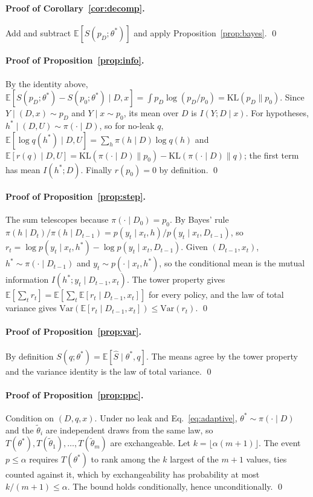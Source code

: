\documentclass[10pt]{article}
\theoremstyle{definition}
\theoremstyle{remark}
\theoremstyle{plain}
\newcommand{\E}{\mathbb{E}}
\newcommand{\KL}{\mathrm{KL}}
\newcommand{\thetastar}{\theta^{*}}
\begin{document}
\paragraph{Proof of Corollary~\ref{cor:decomp}.}
Add and subtract $\E[S(p_D;\thetastar)]$ and apply Proposition~\ref{prop:bayes}. \qed

\paragraph{Proof of Proposition~\ref{prop:info}.}
By the identity above, $\E[S(p_D;\thetastar)-S(p_0;\thetastar)\mid D,x]=\int p_D\log(p_D/p_0)=
\KL(p_D\|p_0)$. Since $Y\mid(D,x)\sim p_D$ and $Y\mid x\sim p_0$, its mean over $D$ is
$I(Y;D\mid x)$. For hypotheses, $h^{*}\mid(D,U)\sim\pi(\cdot\mid D)$, so for no-leak $q$,
$\E[\log q(h^{*})\mid D,U]=\sum_h\pi(h\mid D)\log q(h)$ and
$\E[r(q)\mid D,U]=\KL(\pi(\cdot\mid D)\|p_0)-\KL(\pi(\cdot\mid D)\|q)$; the first term has mean
$I(h^{*};D)$. Finally $r(p_0)=0$ by definition. \qed

\paragraph{Proof of Proposition~\ref{prop:step}.}
The sum telescopes because $\pi(\cdot\mid D_0)=p_0$. By Bayes' rule
$\pi(h\mid D_t)/\pi(h\mid D_{t-1})=p(y_t\mid x_t,h)/p(y_t\mid x_t,D_{t-1})$, so
$r_t=\log p(y_t\mid x_t,h^{*})-\log p(y_t\mid x_t,D_{t-1})$. Given $(D_{t-1},x_t)$,
$h^{*}\sim\pi(\cdot\mid D_{t-1})$ and $y_t\sim p(\cdot\mid x_t,h^{*})$, so the conditional mean is
the mutual information $I(h^{*};y_t\mid D_{t-1},x_t)$. The tower property gives
$\E[\sum_t r_t]=\E[\sum_t\E[r_t\mid D_{t-1},x_t]]$ for every policy, and the law of total variance
gives $\mathrm{Var}(\E[r_t\mid D_{t-1},x_t])\le\mathrm{Var}(r_t)$. \qed

\paragraph{Proof of Proposition~\ref{prop:var}.}
By definition $S(q;\thetastar)=\E[\hat S\mid\thetastar,q]$. The means agree by the tower property
and the variance identity is the law of total variance. \qed

\paragraph{Proof of Proposition~\ref{prop:ppc}.}
Condition on $(D,q,x)$. Under no leak and Eq.~\eqref{eq:adaptive}, $\thetastar\sim\pi(\cdot\mid D)$
and the $\tilde\theta_i$ are independent draws from the same law, so
$T(\thetastar),T(\tilde\theta_1),\dots,T(\tilde\theta_m)$ are exchangeable. Let
$k=\lfloor\alpha(m+1)\rfloor$. The event $p\le\alpha$ requires $T(\thetastar)$ to rank among the $k$
largest of the $m+1$ values, ties counted against it, which by exchangeability has probability at
most $k/(m+1)\le\alpha$. The bound holds conditionally, hence unconditionally. \qed
\end{document}
